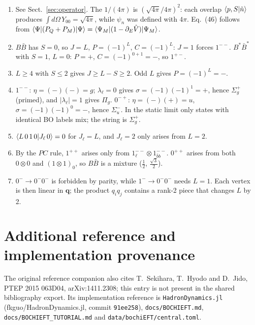 \documentclass[11pt,a4paper]{article}
\begin{document}
\begin{enumerate}
\item See Sect.~\ref{sec:operator}. The $1/(4\pi)$ is $(\sqrt{4\pi}/4\pi)^2$: each overlap $\braket{p,S|\tilde n}$ produces $\int d\Omega\,Y_{00}=\sqrt{4\pi}$, while $\psi_n$ was defined with $4\pi$. Eq.~(46) follows from $\braket{\Psi|(P_Q+P_M)|\Psi}=\braket{\Psi_M|(1-\partial_E\hat V)|\Psi_M}$.
\item $B\bar B$ has $S=0$, so $J=L$, $P=(-1)^L$, $C=(-1)^L$: $J=1$ forces $1^{--}$. $B^*\bar B^*$ with $S=1$, $L=0$: $P=+$, $C=(-1)^{0+1}=-$, so $1^{+-}$.
\item $L\ge4$ with $S\le2$ gives $J\ge L-S\ge2$. Odd $L$ gives $P=(-1)^L=-$.
\item $1^{--}$: $\eta=(-)(-)=g$; $\lambda_\ell=0$ gives $\sigma=(-1)(-1)^1=+$, hence $\Sigma_g^+$ (primed), and $|\lambda_\ell|=1$ gives $\Pi_g$. $0^{-+}$: $\eta=(-)(+)=u$, $\sigma=(-1)(-1)^0=-$, hence $\Sigma_u^-$. In the static limit only states with identical BO labels mix; the string is $\Sigma_g^+$.
\item $\braket{L\,0\,1\,0|J_\ell\,0}=0$ for $J_\ell=L$, and $J_\ell=2$ only arises from $L=2$.
\item By the $PC$ rule, $1^{++}$ arises only from $1_\ell^{--}\otimes1_{\bar bb}^{--}$. $0^{++}$ arises from both $0\otimes0$ and $(1\otimes1)_0$, so $B\bar B$ is a mixture ($\frac12$, $\frac{\sqrt3}{2}$).
\item $0^-\to0^-0^-$ is forbidden by parity, while $1^-\to0^-0^-$ needs $L=1$. Each vertex is then linear in $\bm q$; the product $q_iq_j$ contains a rank-2 piece that changes $L$ by 2.
\end{enumerate}

\section*{Additional reference and implementation provenance}
The original reference companion also cites T.~Sekihara, T.~Hyodo and
D.~Jido, PTEP 2015 063D04, arXiv:1411.2308; this entry is not present in
the shared bibliography export.
Its implementation reference is \texttt{HadronDynamics.jl}
(fkguo/HadronDynamics.jl, commit \texttt{91ee258}),
\texttt{docs/BOCHIEFT.md}, \texttt{docs/BOCHIEFT\_TUTORIAL.md} and
\texttt{data/bochiEFT/central.toml}.

\nocite{Bulava:2024jpj,Bulava:2019iut,Bali:2005fu,Bicudo:2019ymo,
Bruschini:2023zkb,Bondar:2011ev,Baru:2016iwj,TarrusCastella:2022rxb,
Berwein:2024ztx,Brambilla:2026zfw,Eichten:1978tg,Tornqvist:1984xz,
Kalashnikova:2005ui,Baru:2010ww,Hanhart:2011jz,Guo:2016bjq,
Hammer:2016prh,Hanhart:2022qxq,Cincioglu:2016fkm,Bedaque:2003wa,
Alhakami:2017ntb,Habashi:2020ofb,Habashi:2020qgw,Guo:2010ak,
LlanesEstrada:2008fc,TorresRincon:2010fc,Gamermann:2009uq,
Garcia-Recio:2015jsa,Hyodo:2013nka}

\end{document}

